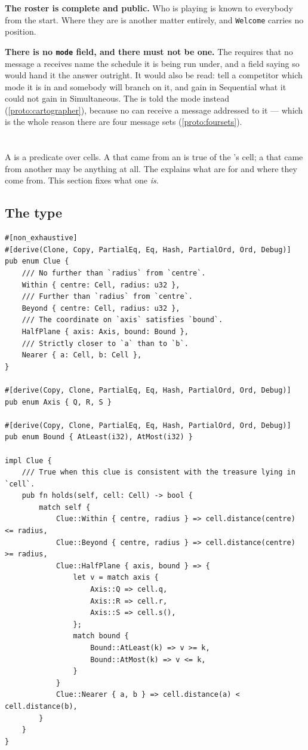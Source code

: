 \documentclass{article}
\begin{document}
\textbf{The roster is complete and public.} Who is playing is known to everybody from the start.
Where they are is another matter entirely, and \texttt{Welcome} carries no position.

\textbf{There is no \texttt{mode} field, and there must not be one.} The \MD{} requires that no
message a \ship{} receives name the schedule it is being run under, and a field saying so would
hand it the answer outright. It would also be read: tell a competitor which mode it is in
and somebody will branch on it, and gain in Sequential what it could not gain in Simultaneous.
The \cartographer{} is told the mode instead (\cref{proto:cartographer}), because no \ship{} can
receive a message addressed to it --- which is the whole reason there are four message sets
(\cref{proto:foursets}).

\newpage
\section{\clues{}}
\label{proto:clue}

A \clue{} is a predicate over cells. A \clue{} that came from an \island{} is true of the
\treasure{}'s cell; a \clue{} that came from another \ship{} may be anything at all. The \MD{}
explains what \clues{} are for and where they come from. This section fixes what one \emph{is}.

\subsection{The type}

\begin{lstlisting}
#[non_exhaustive]
#[derive(Clone, Copy, PartialEq, Eq, Hash, PartialOrd, Ord, Debug)]
pub enum Clue {
    /// No further than `radius` from `centre`.
    Within { centre: Cell, radius: u32 },
    /// Further than `radius` from `centre`.
    Beyond { centre: Cell, radius: u32 },
    /// The coordinate on `axis` satisfies `bound`.
    HalfPlane { axis: Axis, bound: Bound },
    /// Strictly closer to `a` than to `b`.
    Nearer { a: Cell, b: Cell },
}

#[derive(Copy, Clone, PartialEq, Eq, Hash, PartialOrd, Ord, Debug)]
pub enum Axis { Q, R, S }

#[derive(Copy, Clone, PartialEq, Eq, Hash, PartialOrd, Ord, Debug)]
pub enum Bound { AtLeast(i32), AtMost(i32) }

impl Clue {
    /// True when this clue is consistent with the treasure lying in `cell`.
    pub fn holds(self, cell: Cell) -> bool {
        match self {
            Clue::Within { centre, radius } => cell.distance(centre) <= radius,
            Clue::Beyond { centre, radius } => cell.distance(centre) >= radius,
            Clue::HalfPlane { axis, bound } => {
                let v = match axis {
                    Axis::Q => cell.q,
                    Axis::R => cell.r,
                    Axis::S => cell.s(),
                };
                match bound {
                    Bound::AtLeast(k) => v >= k,
                    Bound::AtMost(k) => v <= k,
                }
            }
            Clue::Nearer { a, b } => cell.distance(a) < cell.distance(b),
        }
    }
}
\end{lstlisting}
\end{document}
